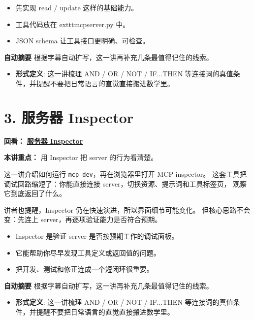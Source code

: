 \documentclass[UTF8,a4paper,11pt]{ctexart}
\newcommand{\videolink}[2]{%
  \href{#1}{\textcolor{videoblue}{\textbf{#2}}}%
}
\begin{document}
\begin{itemize}
  \item 先实现 read / update 这样的基础能力。
  \item 工具代码放在 	exttt{mcpserver.py} 中。
  \item JSON schema 让工具接口更明确、可检查。
\end{itemize}

\begin{keyconcept}
\textbf{自动摘要}
根据字幕自动扩写，这一讲再补充几条最值得记住的线索。
\begin{itemize}
  \item \textbf{形式定义}: 这一讲梳理 AND / OR / NOT / IF...THEN 等连接词的真值条件，并提醒不要把日常语言的直觉直接搬进数学里。
\end{itemize}
\end{keyconcept}

\section*{3. 服务器 Inspector}
\noindent\textbf{回看：}\videolink{https://www.coursera.org/learn/introduction-to-model-context-protocol/home/module/2}{服务器 Inspector}

\textbf{本讲重点：} 用 Inspector 把 server 的行为看清楚。

这一讲介绍如何运行 \texttt{mcp dev}，再在浏览器里打开 MCP inspector。
这套工具把调试回路缩短了：你能直接连接 server，切换资源、提示词和工具标签页，
观察它到底返回了什么。

讲者也提醒，Inspector 仍在快速演进，所以界面细节可能变化。
但核心思路不会变：先连上 server，再逐项验证能力是否符合预期。

\begin{itemize}
  \item Inspector 是验证 server 是否按预期工作的调试面板。
  \item 它能帮助你尽早发现工具定义或返回值的问题。
  \item 把开发、测试和修正连成一个短闭环很重要。
\end{itemize}

\begin{keyconcept}
\textbf{自动摘要}
根据字幕自动扩写，这一讲再补充几条最值得记住的线索。
\begin{itemize}
  \item \textbf{形式定义}: 这一讲梳理 AND / OR / NOT / IF...THEN 等连接词的真值条件，并提醒不要把日常语言的直觉直接搬进数学里。
\end{itemize}
\end{keyconcept}
\end{document}
